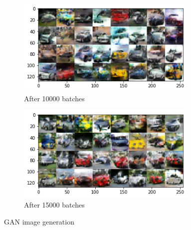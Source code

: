 \begin{figure}[ht]
	\begin{subfigure}[b]{0.4\textwidth}
		\centering
		\captionsetup{ width=0.9\linewidth, format = hang}
		\includegraphics[height = 0.8\textwidth, width = 0.95\textwidth]{Exercise4/Report/gans_1}
		\caption{After 10000 batches}\label{fig:gan_1}
	\end{subfigure}%
	\begin{subfigure}[b]{0.4\textwidth}
		\centering
		\captionsetup{width=0.9\linewidth, format = hang}
		\includegraphics[height = 0.8\textwidth, width = 0.95\textwidth]{Exercise4/Report/gans_2}
		\caption{After 15000 batches}\label{fig:gan_2}
	\end{subfigure}%
	\captionsetup{format = hang}
	\caption{GAN image generation}
	\label{fig:gan}
\end{figure}
